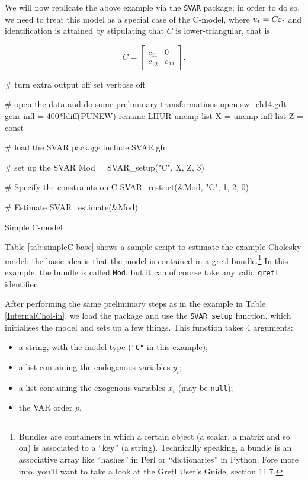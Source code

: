\documentclass[a4paper,10pt]{article}
\newcommand{\app}[1]{\textsf{#1}}
\newcounter{script}[section]
\newcommand{\PrE}[1]{\ensuremath u_{#1}} %
\newcommand{\StS}[1]{\ensuremath \varepsilon_{#1}} %
\begin{document}
We will now replicate the above example via the \texttt{SVAR} package;
in order to do so, we need to treat this model as a special case of
the C-model, where $\PrE{t} = C \StS{t}$ and identification is
attained by stipulating that $C$ is lower-triangular, that is

\begin{equation}
  \label{eq:cholesky}
  C = \left[ \begin{array}{ll} 
      c_{11} & 0 \\ c_{12} & c_{22}    
  \end{array} \right].
\end{equation}

\begin{table}[htbp]
\begin{scode}
# turn extra output off
set verbose off

# open the data and do some preliminary transformations
open sw_ch14.gdt
genr infl = 400*ldiff(PUNEW)
rename LHUR unemp
list X = unemp infl
list Z = const

# load the SVAR package
include SVAR.gfn

# set up the SVAR
Mod = SVAR_setup("C", X, Z, 3)

# Specify the constraints on C
SVAR_restrict(&Mod, "C", 1, 2, 0)

# Estimate
SVAR_estimate(&Mod)
  \end{scode}
  \caption{Simple C-model}
  \label{tab:simpleC-base}
\end{table}

Table \ref{tab:simpleC-base} shows a sample script to estimate the
example Cholesky model: the basic idea is that the model is contained
in a \app{gretl} bundle.\footnote{Bundles are containers in which a certain
  object (a scalar, a matrix and so on) is associated to a ``key'' (a
  string). Technically speaking, a bundle is an associative array like ``hashes''
   in Perl or ``dictionaries'' in Python. Fore more info, you'll want to take a
  look at the Gretl User's Guide, section 11.7.} In this example,
the bundle is called \texttt{Mod}, but it can of course take any valid
\texttt{gretl} identifier.

After performing the same preliminary steps as in the example in Table
\ref{InternalChol-in}, we load the package and use the
\texttt{SVAR\_setup} function, which initialises the model and sets up
a few things. This function takes 4 arguments:
\begin{itemize}
\item a string, with the model type (\texttt{"C"} in this example);
\item a list containing the endogenous variables $y_t$;
\item a list containing the exogenous variables $x_t$ (may be
  \texttt{null});
\item the VAR order $p$.
\end{itemize}
\end{document}
